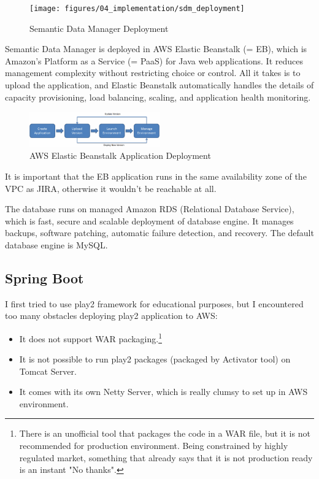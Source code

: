\begin{figure}[!ht]
	\centering
	\texttt{[image: figures/04\_implementation/sdm\_deployment]}
    \caption{Semantic Data Manager Deployment}
\end{figure}

Semantic Data Manager is deployed in AWS Elastic Beanstalk (= EB), which is Amazon's Platform as a Service (= PaaS) for Java web applications. It reduces management complexity without restricting choice or control. All it takes is to upload the application, and Elastic Beanstalk automatically handles the details of capacity provisioning, load balancing, scaling, and application health monitoring. \cite{elasticbeanstalk}

\newpage

\begin{figure}[!ht]
	\centering
	\includegraphics[width=0.5\textwidth]{figures/04_implementation/eb_flowchart}
    \caption{AWS Elastic Beanstalk Application Deployment}
\end{figure}

It is important that the EB application runs in the same availability zone of the VPC as JIRA, otherwise it wouldn't be reachable at all.

The database runs on managed Amazon RDS (Relational Database Service), which is fast, secure and scalable deployment of database engine. It manages backups, software patching, automatic failure detection, and recovery. The default database engine is MySQL.

\subsection{Spring Boot}

I first tried to use play2 framework for educational purposes, but I encountered too many obstacles deploying play2 application to AWS: 

\begin{itemize}
	\item It does not support WAR packaging.\footnote{There is an unofficial tool that packages the code in a WAR file, but it is not recommended for production environment. Being constrained by highly regulated market, something that already says that it is not production ready is an instant "No thanks".}
	\item It is not possible to run play2 packages (packaged by Activator tool) on Tomcat Server.
	\item It comes with its own Netty Server, which is really clumsy to set up in AWS environment.
\end{itemize}

